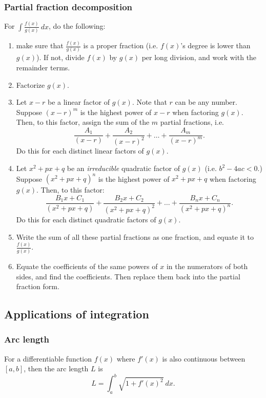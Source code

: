 \documentclass[main.tex]{subfiles}
\begin{document}
\begin{multicols}{2}
	\subsubsection*{Partial fraction decomposition}
	For \(\int \frac{f(x)}{g(x)} \ dx\), do the following:
	\begin{enumerate}
		\item make sure that \(\frac{f(x)}{g(x)}\) is a proper fraction (i.e. \(f(x)\)'s degree is lower than \(g(x)\)). If not, divide \(f(x)\) by \(g(x)\) per long division, and work with the remainder terms.
		\item Factorize \(g(x)\).
		\item Let \(x - r\) be a linear factor of \(g(x)\). Note that \(r\) can be any number. Suppose \((x - r)^m\) is the highest power of \(x - r\) when factoring \(g(x)\). Then, to this factor, assign the sum of the \(m\) partial fractions, i.e. 
		\[\frac{A_1}{(x - r)} + \frac{A_2}{(x - r)^2} + \dots + \frac{A_m}{(x - r)^m}.\] 
		Do this for each distinct linear factors of \(g(x)\).
		\item Let \(x^2 + px + q\) be an \emph{irreducible} quadratic factor of \(g(x)\) (i.e. \(b^2 - 4ac < 0\).) Suppose \((x^2 + px + q)^n\) is the highest power of \(x^2 + px + q\) when factoring \(g(x)\). Then, to this factor: 
		\[\frac{B_1x + C_1}{(x^2 + px + q)} + \frac{B_2x + C_2}{(x^2 + px + q)^2} + \dots + \frac{B_n x + C_n}{(x^2 + px + q)^n}.\]
		Do this for each distinct quadratic factors of \(g(x)\).
		\item Write the sum of all these partial fractions as one fraction, and equate it to \(\frac{f(x)}{g(x)}\).
		\item Equate the coefficients of the same powers of \(x\) in the numerators of both sides, and find the coefficients. Then replace them back into the partial fraction form.
	\end{enumerate}

	\subsection*{Applications of integration}

	\subsubsection*{Arc length}
	For a differentiable function \(f(x)\) where \(f'(x)\) is also continuous between \([a, b]\), then the arc length \(L\) is \[L = \int_a^b \sqrt{1 + f'(x)^2} \ dx.\]


\end{multicols}
\end{document}

